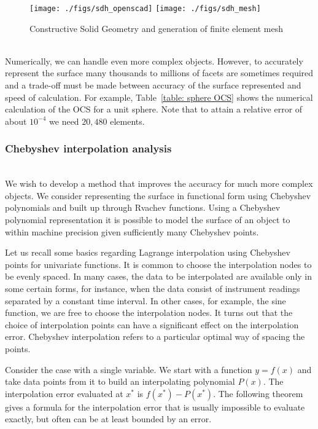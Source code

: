 \documentclass[11pt,reqno]{amsart}
\theoremstyle{definition}
\begin{document}
\begin{figure}   	
\centerline{\texttt{[image: ./figs/sdh\_openscad]}
     	\hspace{-6pt}
		\texttt{[image: ./figs/sdh\_mesh]}}
     	\hspace{-6pt}
		\caption{Constructive Solid Geometry and generation of finite element mesh ~\cite{mesh}}
        \label{fig:sdh_openscad}
\end{figure}

Numerically, we can handle even more complex objects. However, to accurately
represent the surface many thousands to millions of facets are sometimes
required and a trade-off must be made between accuracy of the surface
represented and speed of calculation.  For example, Table~\ref{table: sphere
OCS} shows the numerical calculation of the OCS for a unit sphere. Note that to
attain a relative error of about $10^{-4}$ we need $20{,}480$ elements.  


\subsubsection{Chebyshev interpolation analysis}~\\
We wish to develop a method that improves the accuracy for much more complex
objects. We consider representing the surface in functional form using
Chebyshev polynomials and built up through Rvachev functions. Using a Chebyshev polynomial representation it is possible to model the surface of an object to within machine precision given sufficiently many Chebyshev points.

Let us recall some basics regarding Lagrange interpolation using Chebyshev
points for univariate functions.  It is common to choose the interpolation nodes 
to be evenly spaced. In many cases, the data to be
interpolated are available only in some certain forms, for instance, when the
data consist of instrument readings separated by a constant time interval.
In other cases, for example, the sine function, we are free to
choose the interpolation nodes. It turns out that the choice
of interpolation points can have a significant effect on the interpolation
error. Chebyshev interpolation refers to a particular optimal way of spacing
the points.

Consider the case with a single variable. We start with a function $y=f(x)$ and
take data points from it to build an interpolating polynomial $P(x)$. The
interpolation error evaluated at $x^*$ is $f(x^*)-P(x^*)$. The following
theorem gives a formula for the interpolation error that is usually impossible
to evaluate exactly, but often can be at least bounded by an error.
\end{document}
